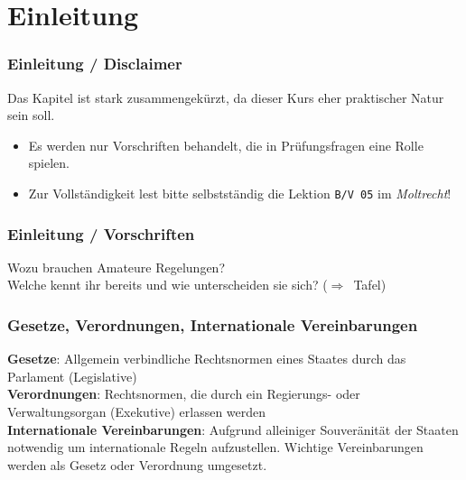 

\subtitle{Betriebstechnik/Vorschriften 05:  \\
  Gesetze, Vorschriften, Regelungen \\[2em]}
\date{Stand 18.09.2017}


\section{Einleitung}

\begin{frame}
  \frametitle{Einleitung / Disclaimer}

  \begin{center}
    \Large{Das Kapitel ist stark zusammengekürzt, da dieser Kurs eher
    praktischer Natur sein soll.}
  \end{center}

  \normalsize

  \begin{itemize}
    \item Es werden nur Vorschriften behandelt, die in Prüfungsfragen eine Rolle spielen.
    \item Zur Vollständigkeit lest bitte selbstständig die Lektion \texttt{B/V 05} im
      \emph{Moltrecht}!
  \end{itemize}

\end{frame}


\begin{frame}
  \frametitle{Einleitung / Vorschriften}

  \begin{center}
    \Large{Wozu brauchen Amateure Regelungen?} \\
    \Large{Welche kennt ihr bereits und wie unterscheiden sie sich? ($\Rightarrow$~Tafel)}
  \end{center}

\end{frame}

\begin{frame}
  \frametitle{Gesetze, Verordnungen, Internationale Vereinbarungen}

  \textbf{Gesetze}: Allgemein verbindliche Rechtsnormen eines Staates durch
  das Parlament (Legislative) \\[1em]

  \textbf{Verordnungen}: Rechtsnormen, die durch ein Regierungs- oder
  Verwaltungsorgan (Exekutive) erlassen werden \\[1em]

  \textbf{Internationale Vereinbarungen}: Aufgrund alleiniger Souveränität der
  Staaten notwendig um internationale Regeln aufzustellen. Wichtige Vereinbarungen
  werden als Gesetz oder Verordnung umgesetzt.

\end{frame}


